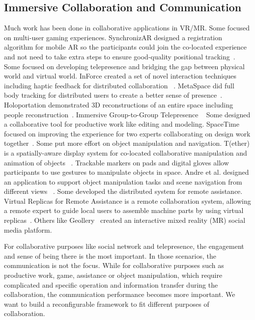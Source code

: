 \documentclass{sigchi}
\begin{document}
\subsection{Immersive Collaboration and Communication}
Much work has been done in collaborative applications in VR/MR.
Some focused on multi-user gaming experiences. SynchronizAR designed a registration algorithm for mobile AR so the participants could join the co-located experience and not need to take extra steps to ensure good-quality positional tracking~\cite{huo2018synchronizar}.
Some focused on developing telepresence and bridging the gap between physical world and virtual world. InForce created a set of novel interaction techniques including haptic feedback for distributed collaboration ~\cite{nakagaki2019inforce}.
MetaSpace did full body tracking for distributed users to create a better sense of presence~\cite{sra2015metaspace}.
Holoportation demonstrated 3D reconstructions of an entire space including people reconstruction~\cite{orts2016holoportation}.
Immersive Group-to-Group Telepresence ~\cite{beck2013immersive}
Some designed a collaborative tool for productive work like editing and modeling. SpaceTime focused on improving the experience for two experts collaborating on design work together~\cite{xia2018spacetime}. 
Some put more effort on object manipulation and navigation.
T(ether) is a spatially-aware display system for co-located collaborative manipulation and animation of objects ~\cite{lakatos2014t}. Trackable markers on pads and digital gloves allow participants to use gestures to manipulate objects in space.
Andre et al. designed an application to support object manipulation tasks and scene navigation from different views ~\cite{kunert2019multi}.
Some developed the distributed system for remote assistance.
Virtual Replicas for Remote Assistance is a remote collaboration system, allowing a remote expert to guide local users to assemble machine parts by using virtual replicas~\cite{oda2015virtual}.
Others like Geollery~\cite{du2019geollery, du2016social} created an interactive mixed reality (MR) social media platform.

For collaborative purposes like social network and telepresence, the engagement and sense of being there is the most important. In those scenarios, the communication is not the focus. While for collaborative purposes such as productive work, game, assistance or object manipulation, which require complicated and specific operation and information transfer during the collaboration, the communication performance becomes more important. We want to build a reconfigurable framework to fit different purposes of collaboration.
\end{document}
